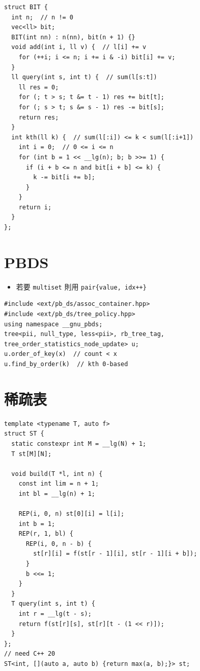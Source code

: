 \documentclass[10pt, a4paper, twocolumn]{article}
\begin{document}
\begin{verbatim}
struct BIT {
  int n;  // n != 0
  vec<ll> bit;
  BIT(int nn) : n(nn), bit(n + 1) {}
  void add(int i, ll v) {  // l[i] += v
    for (++i; i <= n; i += i & -i) bit[i] += v;
  }
  ll query(int s, int t) {  // sum(l[s:t])
    ll res = 0;
    for (; t > s; t &= t - 1) res += bit[t];
    for (; s > t; s &= s - 1) res -= bit[s];
    return res;
  }
  int kth(ll k) {  // sum(l[:i]) <= k < sum(l[:i+1])
    int i = 0;  // 0 <= i <= n
    for (int b = 1 << __lg(n); b; b >>= 1) {
      if (i + b <= n and bit[i + b] <= k) {
        k -= bit[i += b];
      }
    }
    return i;
  }
};
\end{verbatim}

\section{PBDS}

\begin{itemize}[tight_item]
    \item 若要 \texttt{multiset} 則用 \texttt{pair\{value, idx++\}}
\end{itemize}

\begin{verbatim}
#include <ext/pb_ds/assoc_container.hpp>
#include <ext/pb_ds/tree_policy.hpp>
using namespace __gnu_pbds;
tree<pii, null_type, less<pii>, rb_tree_tag, tree_order_statistics_node_update> u;
u.order_of_key(x)  // count < x
u.find_by_order(k)  // kth 0-based
\end{verbatim}

\section{稀疏表}

\begin{verbatim}
template <typename T, auto f>
struct ST {
  static constexpr int M = __lg(N) + 1;
  T st[M][N];

  void build(T *l, int n) {
    const int lim = n + 1;
    int bl = __lg(n) + 1;

    REP(i, 0, n) st[0][i] = l[i];
    int b = 1;
    REP(r, 1, bl) {
      REP(i, 0, n - b) {
        st[r][i] = f(st[r - 1][i], st[r - 1][i + b]);
      }
      b <<= 1;
    }
  }
  T query(int s, int t) {
    int r = __lg(t - s);
    return f(st[r][s], st[r][t - (1 << r)]);
  }
};
// need C++ 20
ST<int, [](auto a, auto b) {return max(a, b);}> st;
\end{verbatim}
\end{document}
